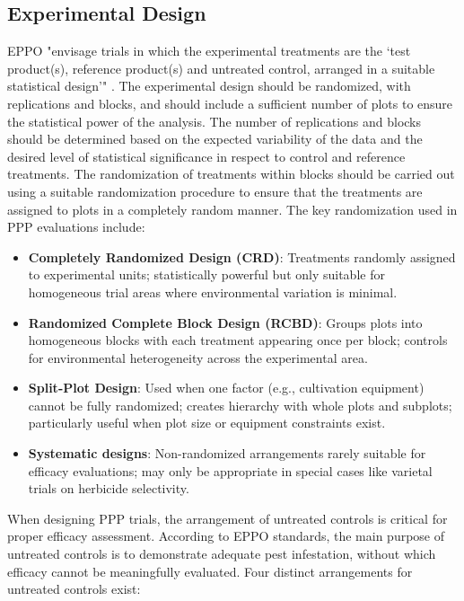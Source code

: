 \documentclass[12pt,a4paper,oneside]{report}
\begin{document}
\subsection{Experimental Design}

EPPO "envisage trials in which the experimental
treatments are the ‘test product(s), reference product(s) and
untreated control, arranged in a suitable statistical design’" \cite{EPPO_PP1_152}.
The experimental design should be randomized, with replications and blocks, and
should include a sufficient number of plots to ensure the statistical power of the
analysis. The number of replications and blocks should be determined based on the
expected variability of the data and the desired level of statistical significance
in respect to control and reference treatments. The
randomization of treatments within blocks should be carried out using a suitable
randomization procedure to ensure that the treatments are assigned to plots in a
completely random manner. The key randomization used in PPP 
evaluations include:

\begin{itemize}
    \item \textbf{Completely Randomized Design (CRD)}: Treatments randomly assigned to 
          experimental units; statistically powerful but only suitable for homogeneous trial 
          areas where environmental variation is minimal.
          
    \item \textbf{Randomized Complete Block Design (RCBD)}: Groups plots into homogeneous 
          blocks with each treatment appearing once per block; controls for environmental 
          heterogeneity across the experimental area.
          
    \item \textbf{Split-Plot Design}: Used when one factor (e.g., cultivation equipment) 
          cannot be fully randomized; creates hierarchy with whole plots and subplots; 
          particularly useful when plot size or equipment constraints exist.
          
    \item \textbf{Systematic designs}: Non-randomized arrangements rarely suitable for 
          efficacy evaluations; may only be appropriate in special cases like varietal 
          trials on herbicide selectivity.
\end{itemize}

When designing PPP trials, the arrangement of untreated controls 
is critical for proper efficacy assessment. According to EPPO standards, the main 
purpose of untreated controls is to demonstrate adequate pest infestation, without 
which efficacy cannot be meaningfully evaluated. Four distinct arrangements for 
untreated controls exist:
\end{document}
